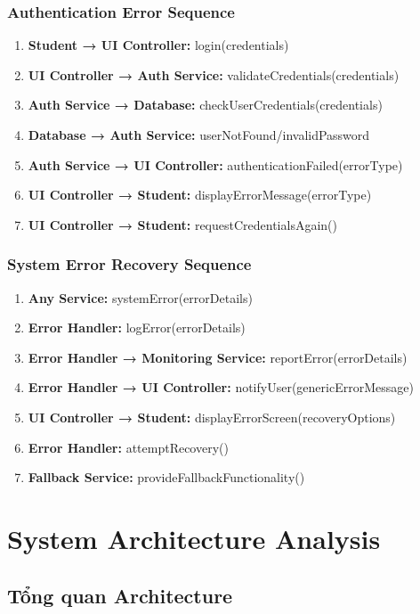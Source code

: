 \subsubsection{Authentication Error Sequence}
\begin{enumerate}
    \item \textbf{Student → UI Controller:} login(credentials)
    \item \textbf{UI Controller → Auth Service:} validateCredentials(credentials)
    \item \textbf{Auth Service → Database:} checkUserCredentials(credentials)
    \item \textbf{Database → Auth Service:} userNotFound/invalidPassword
    \item \textbf{Auth Service → UI Controller:} authenticationFailed(errorType)
    \item \textbf{UI Controller → Student:} displayErrorMessage(errorType)
    \item \textbf{UI Controller → Student:} requestCredentialsAgain()
\end{enumerate}

\subsubsection{System Error Recovery Sequence}
\begin{enumerate}
    \item \textbf{Any Service:} systemError(errorDetails)
    \item \textbf{Error Handler:} logError(errorDetails)
    \item \textbf{Error Handler → Monitoring Service:} reportError(errorDetails)
    \item \textbf{Error Handler → UI Controller:} notifyUser(genericErrorMessage)
    \item \textbf{UI Controller → Student:} displayErrorScreen(recoveryOptions)
    \item \textbf{Error Handler:} attemptRecovery()
    \item \textbf{Fallback Service:} provideFallbackFunctionality()
\end{enumerate}

\section{System Architecture Analysis}
\label{sec:system-architecture}

\subsection{Tổng quan Architecture}
\label{subsec:architecture-overview}

